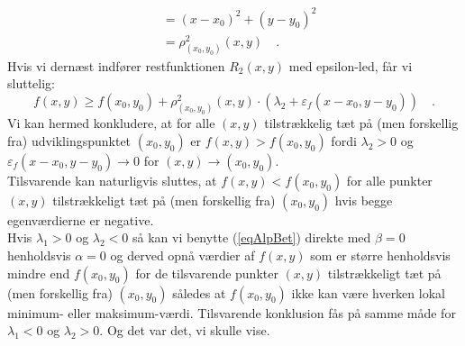 \begin{bevis}
\begin{equation}
\begin{aligned}
&= (x-x_{0})^{2} + (y-y_{0})^{2}  \\
&= \rho^{2}_{(x_{0}, y_{0})}(x,y) \quad .
\end{aligned}
\end{equation}
Hvis vi dernæst indfører restfunktionen $R_{2}(x,y)$ med epsilon-led, får vi sluttelig:
\begin{equation}
f(x,y) \geq f(x_{0}, y_{0}) +  \rho^{2}_{(x_{0}, y_{0})}(x,y) \cdot (\lambda_{2} + \varepsilon_{f}(x-x_{0}, y-y_{0})) \quad.
\end{equation}
Vi kan hermed konkludere, at for  alle $(x,y)$ tilstrækkelig tæt på (men forskellig fra) udviklingspunktet $(x_{0}, y_{0})$ er
$f(x,y) > f(x_{0}, y_{0})$ fordi $\lambda_{2} >0$ og $\varepsilon_{f}(x-x_{0}, y-y_{0}) \to 0$ for $(x,y) \to (x_{0}, y_{0})$. \\

Tilsvarende kan naturligvis sluttes, at $f(x,y) < f(x_{0}, y_{0})$ for  alle punkter $(x,y)$ tilstrækkeligt tæt på (men forskellig fra) $(x_{0}, y_{0})$ hvis begge egenværdierne er negative. \\

Hvis $\lambda_{1} > 0 $ og  $\lambda_{2} <0 $  så kan vi benytte (\ref{eqAlpBet}) direkte med $\beta = 0$ henholdsvis $\alpha = 0$  og derved opnå værdier af $f(x,y)$ som er større henholdsvis mindre end $f(x_{0}, y_{0})$ for de tilsvarende punkter $(x,y)$ tilstrækkeligt tæt på (men forskellig fra) $(x_{0}, y_{0})$ således at $f(x_{0}, y_{0})$ ikke kan være hverken lokal minimum- eller maksimum-værdi. Tilsvarende konklusion fås på samme måde for
$\lambda_{1} < 0 $ og  $\lambda_{2} > 0$.
Og det var det, vi skulle vise.
\end{bevis}


